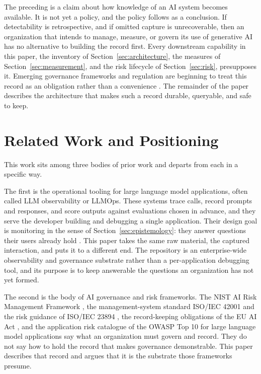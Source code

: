 \documentclass[11pt]{article}
\begin{document}
The preceding is a claim about how knowledge of an AI system becomes available.
It is not yet a policy, and the policy follows as a conclusion. If detectability
is retrospective, and if omitted capture is unrecoverable, then an organization
that intends to manage, measure, or govern its use of generative AI has no
alternative to building the record first. Every downstream capability in this
paper, the inventory of Section~\ref{sec:architecture}, the measures of
Section~\ref{sec:measurement}, and the risk lifecycle of Section~\ref{sec:risk},
presupposes it. Emerging governance frameworks and regulation are beginning to
treat this record as an obligation rather than a convenience
\cite{nist2023airmf, euaiact2024}. The remainder of the paper describes the
architecture that makes such a record durable, queryable, and safe to keep.

\section{Related Work and Positioning}
\label{sec:related}

This work sits among three bodies of prior work and departs from each in a
specific way.

The first is the operational tooling for large language model applications, often
called LLM observability or LLMOps. These systems trace calls, record prompts and
responses, and score outputs against evaluations chosen in advance, and they serve
the developer building and debugging a single application. Their design goal is
monitoring in the sense of Section~\ref{sec:epistemology}: they answer questions
their users already hold \cite{majors2022observability}. This paper takes the same
raw material, the captured interaction, and puts it to a different end. The
repository is an enterprise-wide observability and governance substrate rather than
a per-application debugging tool, and its purpose is to keep answerable the
questions an organization has not yet formed.

The second is the body of AI governance and risk frameworks. The NIST AI Risk
Management Framework \cite{nist2023airmf}, the management-system standard ISO/IEC
42001 \cite{iso42001} and the risk guidance of ISO/IEC 23894 \cite{iso23894}, the
record-keeping obligations of the EU AI Act \cite{euaiact2024}, and the application
risk catalogue of the OWASP Top 10 for large language model applications
\cite{owaspllm} say what an organization must govern and record. They do not say
how to hold the record that makes governance demonstrable. This paper describes that
record and argues that it is the substrate those frameworks presume.
\end{document}
